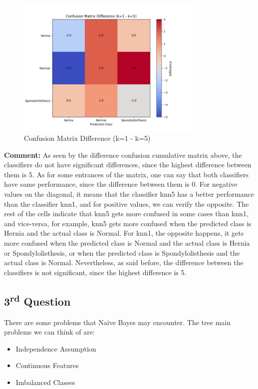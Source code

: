 \documentclass{article}
\begin{document}
\begin{figure}[H]
  \centering
  \includegraphics[width=0.8\textwidth]{images/confusion_matrix_difference.png}
  \caption{Confusion Matrix Difference (k=1 - k=5)}
  \label{fig:confusion_matrix_difference}
\end{figure}

\textbf{Comment:}
As seen by the difference confusion cumulative matrix above, the classifiers do not have significant differences, since the highest difference between them is 5. As for some entrances of the matrix, one can say that both classifiers have same performance, since the difference between them is 0. For negative values on the diagonal, it means that the classifier knn5 has a better performance than the classifier knn1, and for positive values, we can verify the opposite. The rest of the cells indicate that knn5 gets more confused in some cases than knn1, and vice-versa, for example, knn5 gets more confused when the predicted class is Hernia and the actual class is Normal. For knn1, the opposite happens, it gets more confused when the predicted class is Normal and the actual class is Hernia or Spondylolisthesis, or when the predicted class is Spondylolisthesis and the actual class is Normal. 
Nevertheless, as said before, the difference between the classifiers is not significant, since the highest difference is 5.





\subsection*{3\textsuperscript{rd} Question}

There are some problems that Naive Bayes may encounter. The tree main problems we can think of are:
\begin{itemize}
  \item Independence Assumption
  \item Continuous Features
  \item Imbalanced Classes
\end{itemize}
\end{document}
